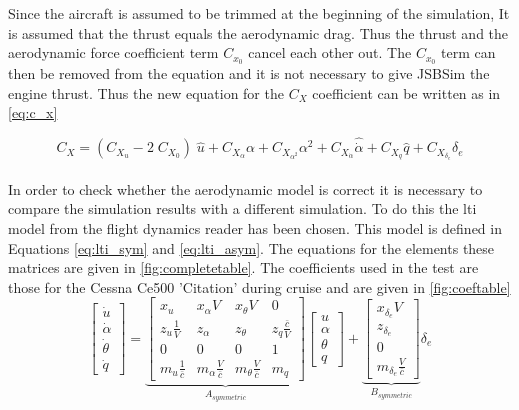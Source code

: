Since the aircraft is assumed to be trimmed at the beginning of the simulation, It is assumed that the thrust equals the aerodynamic drag. Thus the thrust and the aerodynamic force coefficient term $C_{x_0}$ cancel each other out. The $C_{x_0}$ term can then be removed from the equation and it is not necessary to give JSBSim the engine thrust. Thus the new equation for the $C_X$ coefficient can be written as in \autoref{eq:c_x}

\begin{equation}
\label{eq:c_x}
{C_X} = ({C_{{X_u}}} - 2\;{C_{{X_0}}})\;\hat u + {C_{{X_\alpha }}}\alpha  + {C_{{X_{{\alpha ^2}}}}}{\alpha ^2} + C_{{X_{\dot{\alpha}}}}\hat{\dot{\alpha}}  + {C_{{X_q}}}\hat q + {C_{{X_{{\delta _e}}}}}{\delta _e}
\end{equation}\\

In order to check whether the aerodynamic model is correct it is necessary to compare the simulation results with a different simulation. To do this the \gls{lti} model from the flight dynamics reader\cite{fdreader} has been chosen. This model is defined in Equations \ref{eq:lti_sym} and \ref{eq:lti_asym}. The equations for the elements these matrices are given in \autoref{fig:completetable}. The coefficients used in the test are those for the Cessna Ce500 'Citation' during cruise and are given in \autoref{fig:coeftable}\\


\begin{equation}
\label{eq:lti_sym}
\left[ {\begin{array}{*{20}{c}}
    {\dot u} \\ 
    {\dot \alpha } \\ 
    {\dot \theta } \\ 
    {\dot q} 
\end{array}} \right] = \underbrace {\left[ {\begin{array}{*{20}{c}}
    {{x_u}}&{{x_\alpha }V}&{{x_\theta }V}&0 \\ 
    {{z_u}\tfrac{1}{V}}&{{z_\alpha }}&{{z_\theta }}&{{z_q}\tfrac{{\bar c}}{V}} \\ 
    0&0&0&1 \\ 
    {{m_u}\tfrac{1}{{\bar c}}}&{{m_\alpha }\tfrac{V}{{\bar c}}}&{{m_\theta }\tfrac{V}{{\bar c}}}&{{m_q}} 
\end{array}} \right]}_{{A_{symmetric}}}\left[ {\begin{array}{*{20}{c}}
    u \\ 
    \alpha  \\ 
    \theta  \\ 
    q 
\end{array}} \right] + \underbrace {\left[ {\begin{array}{*{20}{c}}
    {{x_{{\delta _e}}}V} \\ 
    {{z_{{\delta _e}}}} \\ 
    0 \\ 
    {{m_{{\delta _e}}}\tfrac{V}{{\bar c}}} 
\end{array}} \right]}_{{B_{symmetric}}}{\delta _e}
\end{equation}


